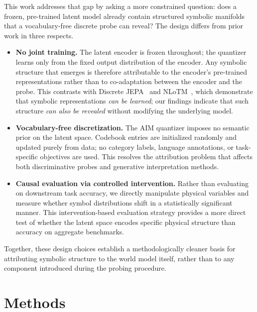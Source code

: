 \documentclass{article}
\begin{document}
This work addresses that gap by asking a more constrained question:
does a frozen, pre-trained latent model already contain structured
symbolic manifolds that a vocabulary-free discrete probe can reveal?
The design differs from prior work in three respects.

\begin{itemize}
  \item \textbf{No joint training.}
    The latent encoder is frozen throughout; the quantizer learns
    only from the fixed output distribution of the encoder.
    Any symbolic structure that emerges is therefore attributable to
    the encoder's pre-trained representations rather than to
    co-adaptation between the encoder and the probe.
    This contrasts with Discrete JEPA~\cite{baek2025discrete} and
    NLoTM~\cite{wu2024nlotm}, which demonstrate that symbolic
    representations \emph{can be learned}; our findings indicate
    that such structure \emph{can also be revealed} without modifying
    the underlying model.

  \item \textbf{Vocabulary-free discretization.}
    The AIM quantizer imposes no semantic prior on the latent space.
    Codebook entries are initialized randomly and updated purely from
    data; no category labels, language annotations, or task-specific
    objectives are used.
    This resolves the attribution problem that affects both
    discriminative probes and generative interpretation methods.

  \item \textbf{Causal evaluation via controlled intervention.}
    Rather than evaluating on downstream task accuracy, we directly
    manipulate physical variables and measure whether symbol
    distributions shift in a statistically significant manner.
    This intervention-based evaluation strategy provides a more
    direct test of whether the latent space encodes specific physical
    structure than accuracy on aggregate benchmarks.
\end{itemize}

Together, these design choices establish a methodologically cleaner
basis for attributing symbolic structure to the world model itself,
rather than to any component introduced during the probing procedure.


\section{Methods} \label{sec:methods}
\end{document}
